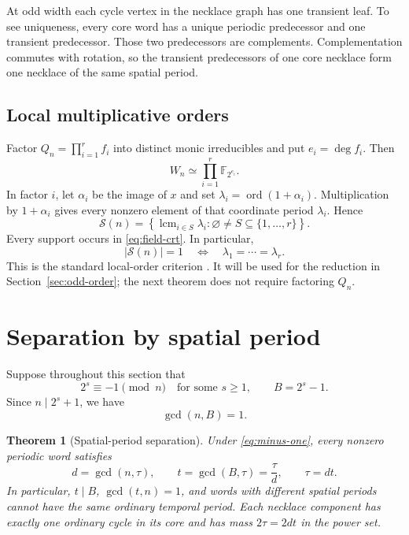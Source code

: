 \documentclass[11pt]{article}
\newtheorem{theorem}{Theorem}[section]
\theoremstyle{definition}
\theoremstyle{remark}
\numberwithin{equation}{section}
\newcommand{\Spec}{\mathcal S}
\DeclareMathOperator{\ord}{ord}
\DeclareMathOperator{\lcm}{lcm}
\begin{document}
At odd width each cycle vertex in the necklace graph has one transient
leaf. To see uniqueness, every core word has a unique periodic predecessor
and one transient predecessor. Those two predecessors are complements.
Complementation commutes with rotation, so the transient predecessors of
one core necklace form one necklace of the same spatial period.

\subsection{Local multiplicative orders}\label{sec:local}

Factor $Q_n=\prod_{i=1}^r f_i$ into distinct monic irreducibles and put
$e_i=\deg f_i$. Then
\begin{equation}\label{eq:field-crt}
 W_n\simeq\prod_{i=1}^r\mathbb F_{2^{e_i}}.
\end{equation}
In factor $i$, let $\alpha_i$ be the image of $x$ and set
$\lambda_i=\ord(1+\alpha_i)$. Multiplication by $1+\alpha_i$ gives every
nonzero element of that coordinate period $\lambda_i$. Hence
\begin{equation}\label{eq:lcm-spectrum}
 \Spec(n)=\left\{\lcm_{i\in S}\lambda_i:
          \varnothing\ne S\subseteq\{1,\ldots,r\}\right\}.
\end{equation}
Every support occurs in \eqref{eq:field-crt}. In particular,
\begin{equation}\label{eq:local-single}
 |\Spec(n)|=1\quad\Longleftrightarrow\quad
 \lambda_1=\cdots=\lambda_r.
\end{equation}
This is the standard local-order criterion \cite{BLM,OEIS}. It will be
used for the reduction in Section~\ref{sec:odd-order}; the next theorem
does not require factoring $Q_n$.

\section{Separation by spatial period}\label{sec:separation}

Suppose throughout this section that
\begin{equation}\label{eq:minus-one}
 2^s\equiv-1\pmod n\quad\text{for some }s\ge1,
 \qquad B=2^s-1.
\end{equation}
Since $n\mid2^s+1$, we have
\begin{equation}\label{eq:coprime}
 \gcd(n,B)=1.
\end{equation}

\begin{theorem}[Spatial-period separation]\label{thm:separation}
Under \eqref{eq:minus-one}, every nonzero periodic word satisfies
\begin{equation}\label{eq:separation}
 \boxed{\quad d=\gcd(n,\tau),\qquad
 t=\gcd(B,\tau)=\frac{\tau}{d},\qquad \tau=dt.\quad}
\end{equation}
In particular, $t\mid B$, $\gcd(t,n)=1$, and words with different spatial
periods cannot have the same ordinary temporal period. Each necklace
component has exactly one ordinary cycle in its core and has mass
$2\tau=2dt$ in the power set.
\end{theorem}
\end{document}
